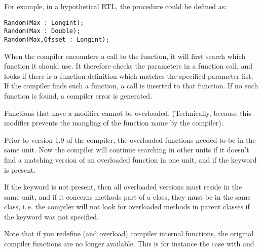 For example, in a hypothetical RTL, the   procedure could be defined as:
\begin{verbatim}
Random(Max : Longint);
Random(Max : Double);
Random(Max,Ofsset : Longint);
\end{verbatim}
When the compiler encounters a call to the  function, it will first search
which function it should use. It therefore checks the parameters in a
function call, and looks if there is a function definition which matches the
specified parameter list. If the compiler finds such a function, a call is
inserted to that function. If no such function is found, a compiler error is
generated.

Functions that have a  modifier cannot be overloaded.
(Technically, because this modifier prevents the mangling of
the function name by the compiler).

Prior to version 1.9 of the compiler, the overloaded functions needed to be
in the same unit. Now the compiler will continue searching in other units if
it doesn't find a matching version of an overloaded function in one unit,
and if the  keyword is present.

If the  keyword is not present, then all overloaded versions
must reside in the same unit, and if it concerns methods part of a class,
they must be in the same class, i.\,e. the compiler will not look for
overloaded methods in parent classes if the  keyword was not
specified.

\begin{remark}
Note that if you redefine (and overload) compiler internal functions, the
original compiler functions are no longer available. This is for instance
the case with  and 
\end{remark}

